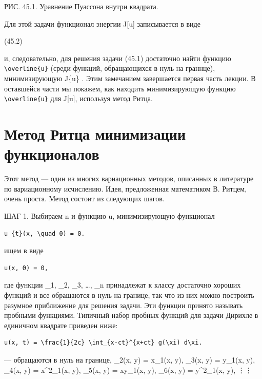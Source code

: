 \documentclass[
  ukrainian,
]{article}
\begin{document}
РИС. 45.1. Уравнение Пуассона внутри квадрата.

Для этой задачи функционал энергии J{[}u{]} записывается в виде

(45.2)

и, следовательно, для решения задачи (45.1) достаточно найти функцию
\texttt{\textbackslash{}overline\{u\}} (среди функций, обращающихся в
нуль на граннце), минимизирующую J\{u\} . Этим замечанием завершается
первая часть лекции. В оставшейся части мы покажем, как находить
минимизирующую функцию \texttt{\textbackslash{}overline\{u\}} для
J{[}u{]}, используя метод Ритца.

\section{Метод Ритца минимизации
функционалов}\label{ux43cux435ux442ux43eux434-ux440ux438ux442ux446ux430-ux43cux438ux43dux438ux43cux438ux437ux430ux446ux438ux438-ux444ux443ux43dux43aux446ux438ux43eux43dux430ux43bux43eux432}

Этот метод --- один из многих вариационных методов, описанных в
литературе по вариационному исчислению. Идея, предложенная математиком
В. Ритцем, очень проста. Метод состоит из следующих шагов.

ШАГ 1. Выбираем n и функцию u, минимизирующую функционал

\begin{verbatim}
u_{t}(x, \quad 0) = 0.
\end{verbatim}

ищем в виде

\begin{verbatim}
u(x, 0) = 0,
\end{verbatim}

где функции \phi\_1, \phi\_2, \phi\_3, \ldots, \phi\_n принадлежат к
классу достаточно хороших функций и все обращаются в нуль на границе,
так что из них можно построить разумное приближение для решения задачи.
Эти функции принято называть пробными функциями. Типичный набор пробных
функций для задачи Дирихле в единичном квадрате приведен ниже:

\begin{verbatim}
u(x, t) = \frac{1}{2c} \int_{x-ct}^{x+ct} g(\xi) d\xi.
\end{verbatim}

--- обращаются в нуль на границе, \varphi\_2(x, y) = x\varphi\_1(x, y),
\varphi\_3(x, y) = y\varphi\_1(x, y), \varphi\_4(x, y) =
x\^{}2\varphi\_1(x, y), \varphi\_5(x, y) = xy\varphi\_1(x, y),
\varphi\_6(x, y) = y\^{}2\varphi\_1(x, y), \vdots     \vdots
\end{document}
